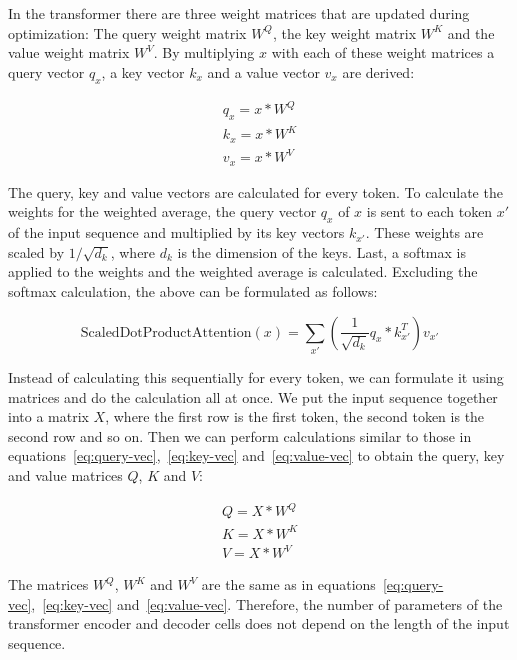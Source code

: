 \documentclass[a4paper]{scrartcl}
\begin{document}
    In the transformer there are three weight matrices that are updated during optimization:
    The query weight matrix $W^Q$, the key weight matrix $W^K$ and the value weight matrix $W^V$.
    By multiplying $x$ with each of these weight matrices a query vector $q_x$, a key vector $k_x$ and a value vector $v_x$ are derived:

    \begin{gather}
        q_x = x * W^Q  \label{eq:query-vec} \\
        k_x = x * W^K  \label{eq:key-vec} \\
        v_x = x * W^V  \label{eq:value-vec}
    \end{gather}

    The query, key and value vectors are calculated for every token.
    To calculate the weights for the weighted average, the query vector $q_x$ of $x$ is sent to each token $x'$ of the input sequence and multiplied by its key vectors $k_{x'}$.
    These weights are scaled by $1 / \sqrt {d_k}$, where $d_k$ is the dimension of the keys.
    Last, a softmax is applied to the weights and the weighted average is calculated.
    Excluding the softmax calculation, the above can be formulated as follows:

    \begin{equation}
        \text{ScaledDotProductAttention}(x) = \sum_{x'} (\frac{1}{\sqrt {d_k}} q_x * k_{x'}^T) v_{x'}\label{eq:scaled-dot-vector}
    \end{equation}

    Instead of calculating this sequentially for every token, we can formulate it using matrices and do the calculation all at once.
    We put the input sequence together into a matrix $X$, where the first row is the first token, the second token is the second row and so on.
    Then we can perform calculations similar to those in equations~\ref{eq:query-vec},~\ref{eq:key-vec} and~\ref{eq:value-vec} to obtain the query, key and value matrices $Q$, $K$ and $V$:

    \begin{gather}
        Q = X * W^Q \label{eq:query-mat} \\
        K = X * W^K \label{eq:key-mat} \\
        V = X * W^V \label{eq:value-mat}
    \end{gather}

    The matrices $W^Q$, $W^K$ and $W^V$ are the same as in equations~\ref{eq:query-vec},~\ref{eq:key-vec} and~\ref{eq:value-vec}.
    Therefore, the number of parameters of the transformer encoder and decoder cells does not depend on the length of the input sequence.
\end{document}
